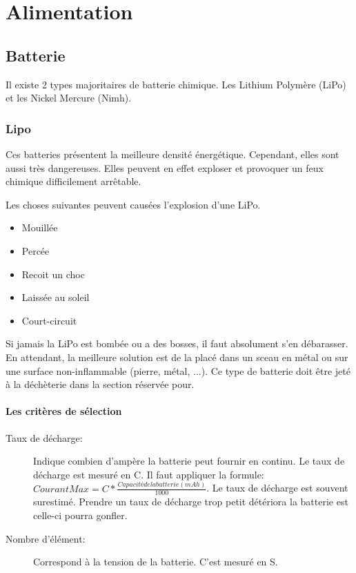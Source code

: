\documentclass[a4paper, 11pt]{report}
\begin{document}
\chapter{Alimentation}

\section{Batterie}
Il existe 2 types majoritaires de batterie chimique. Les Lithium Polymère (LiPo) et les Nickel Mercure (Nimh).

\subsection{Lipo}
Ces batteries présentent la meilleure densité énergétique. Cependant, elles sont aussi très dangereuses. Elles peuvent en effet exploser et provoquer un feux chimique difficilement arrêtable.

Les choses suivantes peuvent causées l'explosion d'une LiPo.
\begin{itemize}
\item Mouillée
\item Percée
\item Recoit un choc
\item Laissée au soleil
\item Court-circuit
\end{itemize}

Si jamais la LiPo est bombée ou a des bosses, il faut absolument s'en débarasser. En attendant, la meilleure solution est de la placé dans un sceau en métal ou sur une surface non-inflammable (pierre, métal, ...). Ce type de batterie doit être jeté à la déchèterie dans la section réservée pour.

\subsubsection{Les critères de sélection}
\begin{description}
\item[Taux de décharge:]Indique combien d'ampère la batterie peut fournir en continu. Le taux de décharge est mesuré en C. Il faut appliquer la formule: $Courant Max = C * \frac{Capacité de la batterie (mAh)}{1000}$. Le taux de décharge est souvent surestimé. Prendre un taux de décharge trop petit détériora la batterie est celle-ci pourra gonfler.
\item[Nombre d'élément:]Correspond à la tension de la batterie. C'est mesuré en S.
\end{description}
\end{document}
